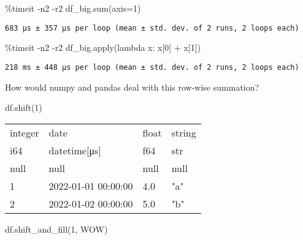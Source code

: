 \documentclass[
  letterpaper,
  DIV=11,
  numbers=noendperiod]{scrartcl}
\newenvironment{Shaded}{\begin{snugshade}}{\end{snugshade}}
\newcommand{\BuiltInTok}[1]{\textcolor[rgb]{0.00,0.23,0.31}{#1}}
\newcommand{\DecValTok}[1]{\textcolor[rgb]{0.68,0.00,0.00}{#1}}
\newcommand{\KeywordTok}[1]{\textcolor[rgb]{0.00,0.23,0.31}{#1}}
\newcommand{\NormalTok}[1]{\textcolor[rgb]{0.00,0.23,0.31}{#1}}
\newcommand{\OperatorTok}[1]{\textcolor[rgb]{0.37,0.37,0.37}{#1}}
\newcommand{\StringTok}[1]{\textcolor[rgb]{0.13,0.47,0.30}{#1}}
\begin{document}
\begin{Shaded}
\begin{Highlighting}[]
\OperatorTok{\%}\NormalTok{timeit }\OperatorTok{{-}}\NormalTok{n2 }\OperatorTok{{-}}\NormalTok{r2 df\_big.}\BuiltInTok{sum}\NormalTok{(axis}\OperatorTok{=}\DecValTok{1}\NormalTok{)}
\end{Highlighting}
\end{Shaded}

\begin{verbatim}
683 µs ± 357 µs per loop (mean ± std. dev. of 2 runs, 2 loops each)
\end{verbatim}

\begin{Shaded}
\begin{Highlighting}[]
\OperatorTok{\%}\NormalTok{timeit }\OperatorTok{{-}}\NormalTok{n2 }\OperatorTok{{-}}\NormalTok{r2 df\_big.}\BuiltInTok{apply}\NormalTok{(}\KeywordTok{lambda}\NormalTok{ x: x[}\DecValTok{0}\NormalTok{] }\OperatorTok{+}\NormalTok{ x[}\DecValTok{1}\NormalTok{])}
\end{Highlighting}
\end{Shaded}

\begin{verbatim}
218 ms ± 448 µs per loop (mean ± std. dev. of 2 runs, 2 loops each)
\end{verbatim}

How would numpy and pandas deal with this row-wise summation?

\begin{Shaded}
\begin{Highlighting}[]
\NormalTok{df.shift(}\DecValTok{1}\NormalTok{)}
\end{Highlighting}
\end{Shaded}

\begin{longtable}[]{@{}llll@{}}
\toprule()
integer & date & float & string \\
i64 & datetime{[}μs{]} & f64 & str \\
\midrule()
\endhead
null & null & null & null \\
1 & 2022-01-01 00:00:00 & 4.0 & "a" \\
2 & 2022-01-02 00:00:00 & 5.0 & "b" \\
\bottomrule()
\end{longtable}

\begin{Shaded}
\begin{Highlighting}[]
\NormalTok{df.shift\_and\_fill(}\DecValTok{1}\NormalTok{, }\StringTok{\textquotesingle{}WOW\textquotesingle{}}\NormalTok{)}
\end{Highlighting}
\end{Shaded}
\end{document}
